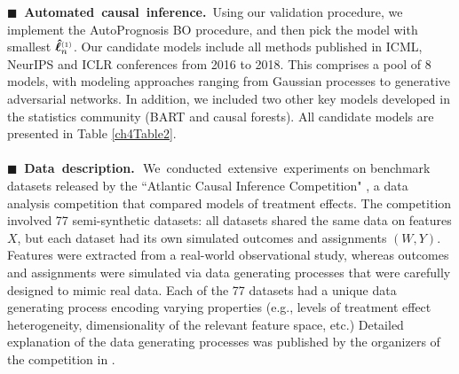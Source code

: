 \documentclass [PhD] {uclathes}
\begin{document}
{\bf \mbox{\tiny $\blacksquare$}\, Automated~causal~inference.}\, Using our validation procedure, we implement the AutoPrognosis BO procedure, and then pick the model with smallest \mbox{\footnotesize $\boldsymbol{\hat{\ell}}^{\mbox{\tiny $(1)$}}_n$}. Our candidate models include all methods published in ICML, NeurIPS and ICLR conferences from 2016 to 2018. This comprises a pool of 8 models, with modeling approaches ranging from Gaussian processes to generative adversarial networks. In addition, we included two other key models developed in the statistics community (BART and causal forests). All candidate models are presented in Table \ref{ch4Table2}.\\
\\
{\bf \mbox{\tiny $\blacksquare$}\, Data~description.}\,~We~conducted~extensive~experiments on benchmark datasets released by the ``Atlantic Causal Inference Competition" \cite{HillACIC}, a data analysis competition that compared models of treatment effects. The competition involved 77 semi-synthetic datasets: all datasets shared the same data on features \mbox{\footnotesize $X$}, but each dataset had its own simulated outcomes and assignments \mbox{\footnotesize $(W,Y)$}. Features were extracted from a real-world observational study, whereas outcomes and assignments were simulated via data generating processes that were carefully designed to mimic real data. Each of the 77 datasets had a unique data generating process encoding varying properties (e.g., levels of treatment effect heterogeneity, dimensionality of the relevant feature space, etc.) Detailed explanation of the data generating processes was published by the organizers of the competition in \cite{dorie2017automated}. %
\end{document}
